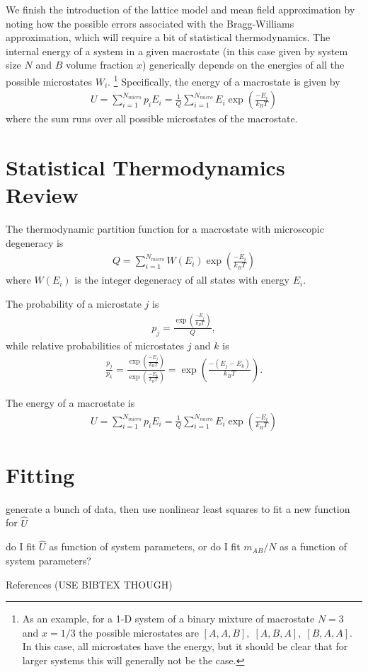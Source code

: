 \documentclass[10pt]{article}
\begin{document}
We finish the introduction of the lattice model and mean field approximation by noting how the possible errors associated with the Bragg-Williams approximation, which will require a bit of statistical thermodynamics.
The internal energy of a system in a given macrostate (in this case given by system size $N$ and $B$ volume fraction $x$) generically depends on the energies of all the possible microstates $W_i$. \footnote{As an example, for a 1-D system of a binary mixture of macrostate $N=3$ and $x=1/3$ the possible microstates are $[A,A,B],\; [A,B,A],\; [B,A,A]$. In this case, all microstates have the energy, but it should be clear that for larger systems this will generally not be the case.}
Specifically, the energy of a macrostate is given by
\begin{align}
    U = \sum_{i=1}^{N_{micro}} p_i E_i
    = \frac{1}{Q} \sum_{i=1}^{N_{micro}} E_i \exp\left(\frac{-E_i}{k_B T}\right)
\end{align}
where the sum runs over all possible microstates of the macrostate.


\section{Statistical Thermodynamics Review}
The thermodynamic partition function for a macrostate with microscopic degeneracy is
\begin{align}
    Q = \sum_{i=1}^{N_{micro}} W(E_i) \exp \left(\frac{-E_i}{k_B T} \right)
\end{align}
where $W(E_i)$ is the integer degeneracy of all states with energy $E_i$.

The probability of a microstate $j$ is
\begin{align}
    p_j = \frac{\exp\left(\frac{-E_j}{k_B T}\right)}{Q} ,
\end{align}
while relative probabilities of microstates $j$ and $k$ is
\begin{align}
    \frac{p_j}{p_k} =
    \frac{\exp\left(\frac{-E_j}{k_B T}\right)}{\exp\left(\frac{-E_k}{k_B T}\right)}
    = \exp\left(\frac{-(E_j-E_k)}{k_B T}\right).
\end{align}

The energy of a macrostate is
\begin{align}
    U = \sum_{i=1}^{N_{micro}} p_i E_i
    = \frac{1}{Q} \sum_{i=1}^{N_{micro}} E_i \exp\left(\frac{-E_i}{k_B T}\right)
\end{align}

\section{Fitting}
generate a bunch of data, then use nonlinear least squares to fit a new function for $\hat{U}$

do I fit $\hat{U}$ as function of system parameters, or do I fit $m_{AB}/N$ as a function of system parameters?

\newpage

References (USE BIBTEX THOUGH)
\end{document}
